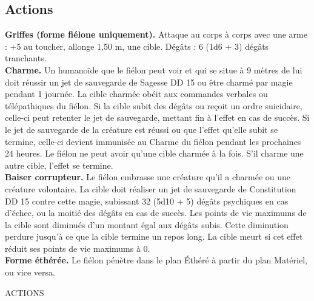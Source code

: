 \begin{figure*}[hb!]
{\begin{minipage}[c]{.45\linewidth}
    \subsection*{Actions}
    {\bfseries Griffes (forme fiélone uniquement).} Attaque au corps à corps avec une arme : +5 au toucher, allonge 1,50 m, une cible. Dégâts : 6 (1d6 + 3) dégâts tranchants. \\
    {\bfseries Charme.} Un humanoïde que le fiélon peut voir et qui se situe à 9 mètres de lui doit réussir un jet de sauvegarde de Sagesse DD 15 ou être charmé par magie pendant 1 journée. La cible charmée obéit aux commandes verbales ou télépathiques du fiélon. Si la cible subit des dégâts ou reçoit un ordre suicidaire, celle-ci peut retenter le jet de sauvegarde, mettant fin à l'effet en cas de succès. Si le jet de sauvegarde de la créature est réussi ou que l'effet qu'elle subit se termine, celle-ci devient immunisée au Charme du fiélon pendant les prochaines 24 heures. Le fiélon ne peut avoir qu'une cible charmée à la fois. S'il charme une autre cible, l'effet se termine. \\
    {\bfseries Baiser corrupteur.} Le fiélon embrasse une créature qu'il a charmée ou une créature volontaire. La cible doit réaliser un jet de sauvegarde de Constitution DD 15 contre cette magie, subissant 32 (5d10 + 5) dégâts psychiques en cas d'échec, ou la moitié des dégâts en cas de succès. Les points de vie maximums de la cible sont diminués d'un montant égal aux dégâts subis. Cette diminution perdure jusqu'à ce que la cible termine un repos long. La cible meurt si cet effet réduit ses points de vie maximums à 0. \\
    {\bfseries Forme éthérée.} Le fiélon pénètre dans le plan Éthéré à partir du plan Matériel, ou vice versa.
  \end{minipage}
}%
\end{figure*}

ACTIONS
